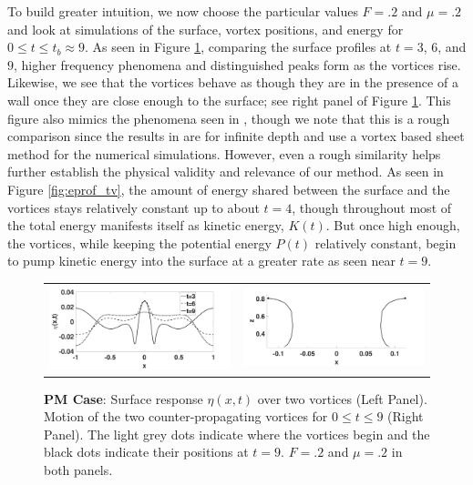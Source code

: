 \documentclass[a4paper,11pt]{article}
\begin{document}
To build greater intuition, we now choose the particular values $F=.2$ and $\mu=.2$ and look at simulations of the surface, vortex positions, and energy for $0\leq t \leq t_{b}\approx 9$.  As seen in Figure \ref{fig:surfrepFpt2}, comparing the surface profiles at $t=3$, $6$, and $9$, higher frequency phenomena and distinguished peaks form as the vortices rise.  Likewise, we see that the vortices behave as though they are in the presence of a wall once they are close enough to the surface; see right panel of Figure \ref{fig:surfrepFpt2}.  This figure also mimics the phenomena seen in \cite{tryggvason}, though we note that this is a rough comparison since the results in \cite{tryggvason} are for infinite depth and use a vortex based sheet method for the numerical simulations.  However, even a rough similarity helps further establish the physical validity and relevance of our method.  As seen in Figure \ref{fig:eprof_tv}, the amount of energy shared between the surface and the vortices stays relatively constant up to about $t=4$, though throughout most of the total energy manifests itself as kinetic energy, $K(t)$.  But once high enough, the vortices, while keeping the potential energy $P(t)$ relatively constant, begin to pump kinetic energy into the surface at a greater rate as seen near $t=9$.
%
\begin{figure}[!h]
\centering
\begin{tabular}{cc}
\includegraphics[width=.5\textwidth]{surf_resp_mu_pt2_F_pt2} & 
\includegraphics[width=.5\textwidth]{tracks_F_pt2_tf_9}
\end{tabular}
\caption{\small {\bf PM Case}: Surface response $\eta(x,t)$ over two vortices (Left Panel).  Motion of the two counter-propagating vortices for $0\leq t \leq 9$ (Right Panel).  The light grey dots indicate where the vortices begin and the black dots indicate their positions at $t=9$.  $F=.2$ and $\mu=.2$ in both panels.}
\label{fig:surfrepFpt2}
\end{figure}
\end{document}
